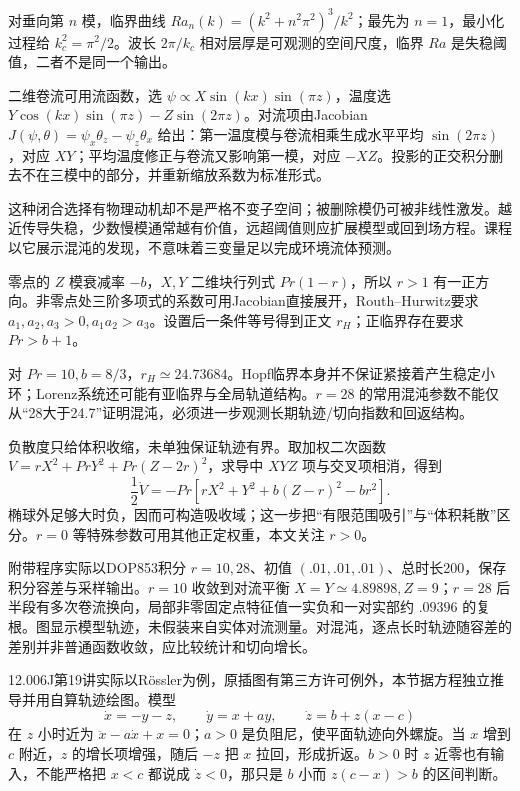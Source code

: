 对垂向第 $n$ 模，临界曲线 $Ra_n(k)=(k^2+n^2\pi^2)^3/k^2$；最先为 $n=1$，最小化过程给 $k_c^2=\pi^2/2$。波长 $2\pi/k_c$ 相对层厚是可观测的空间尺度，临界 $Ra$ 是失稳阈值，二者不是同一个输出。

二维卷流可用流函数，选 $\psi\propto X\sin(kx)\sin(\pi z)$，温度选 $Y\cos(kx)\sin(\pi z)-Z\sin(2\pi z)$。对流项由Jacobian $J(\psi,\theta)=\psi_x\theta_z-\psi_z\theta_x$ 给出：第一温度模与卷流相乘生成水平平均 $\sin(2\pi z)$，对应 $XY$；平均温度修正与卷流又影响第一模，对应 $-XZ$。投影的正交积分删去不在三模中的部分，并重新缩放系数为标准形式。

这种闭合选择有物理动机却不是严格不变子空间；被删除模仍可被非线性激发。越近传导失稳，少数慢模通常越有价值，远超阈值则应扩展模型或回到场方程。课程以它展示混沌的发现，不意味着三变量足以完成环境流体预测。

零点的 $Z$ 模衰减率 $-b$，$X,Y$ 二维块行列式 $Pr(1-r)$，所以 $r>1$ 有一正方向。非零点处三阶多项式的系数可用Jacobian直接展开，Routh--Hurwitz要求 $a_1,a_2,a_3>0,a_1a_2>a_3$。设置后一条件等号得到正文 $r_H$；正临界存在要求 $Pr>b+1$。

对 $Pr=10,b=8/3$，$r_H\simeq24.73684$。Hopf临界本身并不保证紧接着产生稳定小环；Lorenz系统还可能有亚临界与全局轨道结构。$r=28$ 的常用混沌参数不能仅从“28大于24.7”证明混沌，必须进一步观测长期轨迹/切向指数和回返结构。

负散度只给体积收缩，未单独保证轨迹有界。取加权二次函数 $V=rX^2+PrY^2+Pr(Z-2r)^2$，求导中 $XYZ$ 项与交叉项相消，得到
\[
\frac12\dot V=-Pr[rX^2+Y^2+b(Z-r)^2-br^2].
\]
椭球外足够大时负，因而可构造吸收域；这一步把“有限范围吸引”与“体积耗散”区分。$r=0$ 等特殊参数可用其他正定权重，本文关注 $r>0$。

附带程序实际以DOP853积分 $r=10,28$、初值 $(.01,.01,.01)$、总时长200，保存积分容差与采样输出。$r=10$ 收敛到对流平衡 $X=Y\simeq4.89898,Z=9$；$r=28$ 后半段有多次卷流换向，局部非零固定点特征值一实负和一对实部约 $.09396$ 的复根。图显示模型轨迹，未假装来自实体对流测量。对混沌，逐点长时轨迹随容差的差别并非普通函数收敛，应比较统计和切向增长。

12.006J第19讲实际以R\"ossler为例，原插图有第三方许可例外，本节据方程独立推导并用自算轨迹绘图。模型
\[
\dot x=-y-z,\qquad\dot y=x+ay,\qquad\dot z=b+z(x-c)
\]
在 $z$ 小时近为 $\ddot x-a\dot x+x=0$；$a>0$ 是负阻尼，使平面轨迹向外螺旋。当 $x$ 增到 $c$ 附近，$z$ 的增长项增强，随后 $-z$ 把 $x$ 拉回，形成折返。$b>0$ 时 $z$ 近零也有输入，不能严格把 $x<c$ 都说成 $\dot z<0$，那只是 $b$ 小而 $z(c-x)>b$ 的区间判断。

